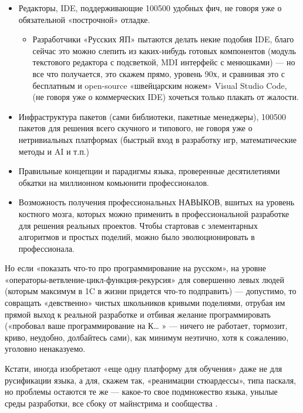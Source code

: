 ﻿\documentclass[a4paper,12pt]{article}
\begin{document}
\begin{itemize}
\tightlist
\item
  Редакторы, IDE, поддерживающие 100500 удобных фич, не говоря уже о
  обязательной «построчной» отладке.

  \begin{itemize}
  \tightlist
  \item
    Разработчики «Русских ЯП» пытаются делать некие подобия IDE, благо
    сейчас это можно слепить из каких-нибудь готовых компонентов (модуль
    текстового редактора с подсветкой, MDI интерфейс с менюшками) --- но
    все что получается, это скажем прямо, уровень 90х, и сравнивая это с
    бесплатным и open-source «швейцарским ножем» Visual Studio Code, (не
    говоря уже о коммерческих IDE) хочеться только плакать от жалости.
  \end{itemize}
\item
  Инфраструктура пакетов (сами библиотеки, пакетные менеджеры), 100500
  пакетов для решения всего скучного и типового, не говоря уже о
  нетривиальных платформах (быстрый вход в разработку игр,
  математические методы и AI и т.п.)
\item
  Правильные концепции и парадигмы языка, проверенные десятилетиями
  обкатки на миллионном комьюнити профессионалов.
\item
  Возможность получения профессиональных НАВЫКОВ, вшитых на уровень
  костного мозга, которых можно применить в профессиональной разработке
  для решения реальных проектов. Чтобы стартовав с элементарных
  алгоритмов и простых поделий, можно было эволюционировать в
  профессионала.
\end{itemize}

Но если «показать что-то про программирование на русском», на уровне
«операторы-ветвление-цикл-функция-рекурсия» для совершенно левых людей
(которым максимум в 1C в жизни придется что-то подправить) ---
допустимо, то совращать «девственно» чистых школьников кривыми
поделиями, отрубая им прямой выход к реальной разработке и отбивая
желание программировать («пробовал ваше программирование на К\ldots{} »
--- ничего не работает, тормозит, криво, неудобно, долбайтесь сами), как
минимум неэтично, хотя к сожалению, уголовно ненаказуемо.

Кстати, иногда изобретают «еще одну платформу для обучения» даже не для
русификации языка, а для, скажем так, «реанимации стюардессы», типа
паскаля, но проблемы остаются те
же --- какое-то свое подмножество языка, унылые среды разработки, все
сбоку от майнстрима и сообщества \cite{pascal-sucks}.
\end{document}
